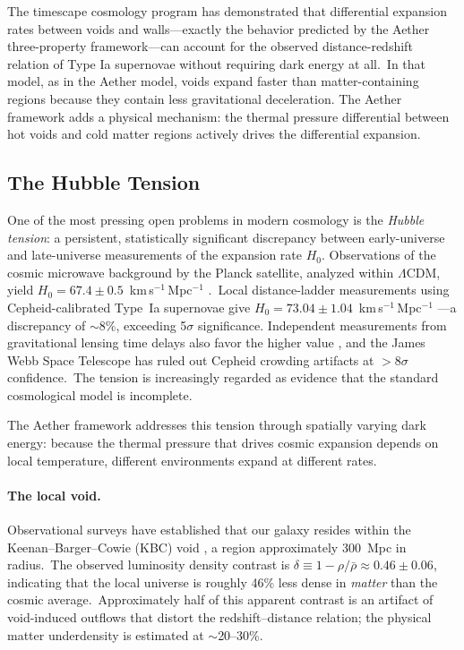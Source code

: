 ﻿\documentclass[12pt,letterpaper]{article}
\begin{document}
The timescape cosmology program \cite{wiltshire2025} has demonstrated that
differential expansion rates between voids and walls---exactly the behavior
predicted by the Aether three-property framework---can account for the observed
distance-redshift relation of Type Ia supernovae without requiring dark energy
at all.\ In that model, as in the Aether model, voids expand faster than
matter-containing regions because they contain less gravitational deceleration.
The Aether framework adds a physical mechanism: the thermal pressure differential
between hot voids and cold matter regions actively drives the differential
expansion.


\subsection{The Hubble Tension}
\label{sec:hubble-tension}

One of the most pressing open problems in modern cosmology is the \emph{Hubble
tension}: a persistent, statistically significant discrepancy between
early-universe and late-universe measurements of the expansion rate $H_0$.
Observations of the cosmic microwave background by the Planck satellite, analyzed
within $\Lambda$CDM, yield $H_0 = 67.4 \pm 0.5$~km\,s$^{-1}$\,Mpc$^{-1}$
\cite{planck2020}.\ Local distance-ladder measurements using Cepheid-calibrated
Type~Ia supernovae give $H_0 = 73.04 \pm 1.04$~km\,s$^{-1}$\,Mpc$^{-1}$
\cite{riess2022}---a discrepancy of $\sim$8\%, exceeding 5$\sigma$ significance.
Independent measurements from gravitational lensing time delays also favor the
higher value \cite{wong2020}, and the James Webb Space Telescope has ruled out
Cepheid crowding artifacts at $>$8$\sigma$ confidence.\ The tension is
increasingly regarded as evidence that the standard cosmological model is
incomplete.

The Aether framework addresses this tension through spatially varying dark
energy: because the thermal pressure that drives cosmic expansion depends on
local temperature, different environments expand at different rates.

\paragraph{The local void.}
Observational surveys have established that our galaxy resides within the
Keenan--Barger--Cowie (KBC) void \cite{haslbauer2020}, a region approximately
300~Mpc in radius.\ The observed luminosity density contrast is
$\delta \equiv 1 - \rho/\bar\rho \approx 0.46 \pm 0.06$, indicating that the
local universe is roughly 46\% less dense in \emph{matter} than the cosmic
average.\ Approximately half of this apparent contrast is an artifact of
void-induced outflows that distort the redshift--distance relation; the physical
matter underdensity is estimated at $\sim$20--30\%.
\end{document}
